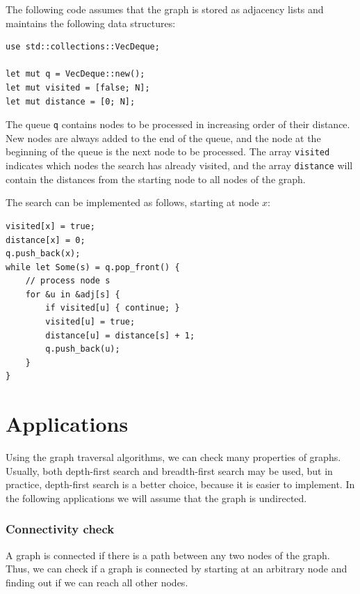 The following code assumes that the graph is stored
as adjacency lists and maintains the following
data structures:
\begin{lstlisting}
use std::collections::VecDeque;

let mut q = VecDeque::new();
let mut visited = [false; N];
let mut distance = [0; N];
\end{lstlisting}

The queue \texttt{q}
contains nodes to be processed
in increasing order of their distance.
New nodes are always added to the end
of the queue, and the node at the beginning
of the queue is the next node to be processed.
The array \texttt{visited} indicates
which nodes the search has already visited,
and the array \texttt{distance} will contain the
distances from the starting node to all nodes of the graph.

The search can be implemented as follows,
starting at node $x$:
\begin{lstlisting}
visited[x] = true;
distance[x] = 0;
q.push_back(x);
while let Some(s) = q.pop_front() {
    // process node s
    for &u in &adj[s] {
        if visited[u] { continue; }
        visited[u] = true;
        distance[u] = distance[s] + 1;
        q.push_back(u);
    }
}
\end{lstlisting}

\section{Applications}

Using the graph traversal algorithms,
we can check many properties of graphs.
Usually, both depth-first search and
breadth-first search may be used,
but in practice, depth-first search
is a better choice, because it is
easier to implement.
In the following applications we will
assume that the graph is undirected.

\subsubsection{Connectivity check}


A graph is connected if there is a path
between any two nodes of the graph.
Thus, we can check if a graph is connected
by starting at an arbitrary node and
finding out if we can reach all other nodes.

